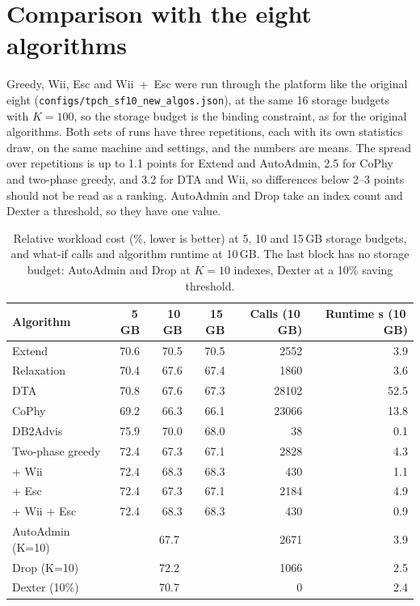 \section{Comparison with the eight algorithms}\label{sec:compare}
Greedy, Wii, Esc and Wii~+~Esc were run through the platform like the original eight (\texttt{configs/tpch\_sf10\_new\_algos.json}), at the same 16 storage budgets with $K=100$, so the storage budget is the binding constraint, as for the original algorithms. Both sets of runs have three repetitions, each with its own statistics draw, on the same machine and settings, and the numbers are means. The spread over repetitions is up to 1.1 points for Extend and AutoAdmin, 2.5 for CoPhy and two-phase greedy, and 3.2 for DTA and Wii, so differences below 2--3 points should not be read as a ranking. AutoAdmin and Drop take an index count and Dexter a threshold, so they have one value.

\begin{table}[h]\centering\small
\begin{tabular}{lrrrrr}
\toprule
Algorithm & 5\,GB & 10\,GB & 15\,GB & Calls (10\,GB) & Runtime s (10\,GB)\\
\midrule
Extend & 70.6 & 70.5 & 70.5 & 2552 & 3.9\\
Relaxation & 70.4 & 67.6 & 67.4 & 1860 & 3.6\\
DTA & 70.8 & 67.6 & 67.3 & 28102 & 52.5\\
CoPhy & 69.2 & 66.3 & 66.1 & 23066 & 13.8\\
DB2Advis & 75.9 & 70.0 & 68.0 & 38 & 0.1\\
Two-phase greedy & 72.4 & 67.3 & 67.1 & 2828 & 4.3\\
\quad + Wii & 72.4 & 68.3 & 68.3 & 430 & 1.1\\
\quad + Esc & 72.4 & 67.3 & 67.1 & 2184 & 4.9\\
\quad + Wii + Esc & 72.4 & 68.3 & 68.3 & 430 & 0.9\\
\midrule
AutoAdmin (K=10) & \multicolumn{3}{c}{67.7} & 2671 & 3.9\\
Drop (K=10) & \multicolumn{3}{c}{72.2} & 1066 & 2.5\\
Dexter (10\%) & \multicolumn{3}{c}{70.7} & 0 & 2.4\\
\bottomrule
\end{tabular}
\caption{Relative workload cost (\%, lower is better) at 5, 10 and 15\,GB storage budgets, and what-if calls and algorithm runtime at 10\,GB. The last block has no storage budget: AutoAdmin and Drop at $K=10$ indexes, Dexter at a 10\% saving threshold.}\label{tab:compare}
\end{table}

